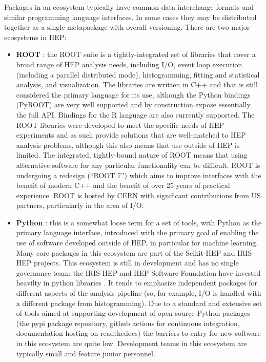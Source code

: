 Packages in an ecosystem typically have common data interchange formats and similar programming language interfaces. In some cases they may be distributed together as a single metapackage with overall versioning. There are two major ecosystems in HEP:
\begin{itemize}
    \item \textbf{ROOT} \cite{Brun:1997pa}: the ROOT suite is a tightly-integrated set of libraries that cover a broad range of HEP analysis needs, including I/O, event loop execution (including a parallel distributed mode), histogramming, fitting and statistical analysis, and visualization. The libraries are written in C++ and that is still considered the primary language for its use, although the Python bindings (PyROOT) are very well supported and by construction expose essentially the full API.  Bindings for the R language are also currently supported. The ROOT libraries were developed to meet the specific needs of HEP experiments and as such provide solutions that are well-matched to HEP analysis problems, although this also means that use outside of HEP is limited. The integrated, tightly-bound nature of ROOT means that using alternative software for any particular functionality can be difficult. ROOT is undergoing a redesign \cite{Naumann:2022pub} (``ROOT 7'') which aims to improve interfaces with the benefit of modern C++ and the benefit of over 25 years of practical experience. ROOT is hosted by CERN with significant contributions from US partners, particularly in the area of I/O.
    \item \textbf{Python} \cite{van1995python,10.5555/1593511}: this is a somewhat loose term for a set of tools, with Python as the primary language interface, introduced with the primary goal of enabling the use of software developed outside of HEP, in particular for machine learning. Many core packages in this ecosystem are part of the Scikit-HEP \cite{Rodrigues:2020syo} and IRIS-HEP \cite{IRISHEPWEB} projects. This ecosystem is still in development and has no single governance team; the IRIS-HEP and HEP Software Foundation have invested heavilty in python libraries \cite{Pivarski:2022ycs,}. It tends to emphasize independent packages for different aspects of the analysis pipeline (so, for example, I/O is handled with a different package from histogramming). Due to a standard and extensive set of tools aimed at supporting development of open source Python packages (the pypi package repository, github actions for continuous integration, documentation hosting on readthedocs) the barriers to entry for new software in this ecosystem are quite low. Development teams in this ecosystem are typically small and feature junior personnel.
\end{itemize}

